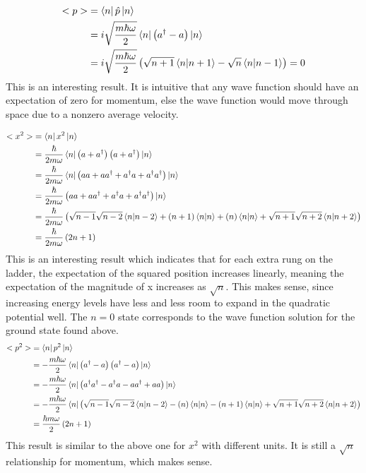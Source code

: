 \documentclass[10pt]{article} %
\begin{document}
\begin{align*}
  <p> &= \bra{n}\hat{p}\ket{n}\\
  &= i\sqrt{\frac{m\hbar\omega}{2}}\bra{n}\left(a^\dagger-a\right)\ket{n}\\
  &= i\sqrt{\frac{m\hbar\omega}{2}}
  \left(\sqrt{n+1}\bra{n}\ket{n+1} - \sqrt{n}\bra{n}\ket{n-1}\right) = 0\\
\end{align*}
This is an interesting result. It is intuitive that any wave function should have an expectation of
zero for momentum, else the wave function would move through space due to a nonzero average
velocity.

\begin{align*}
  <x^2> &= \bra{n}x^2\ket{n}\\
  &= \frac{\hbar}{2m\omega}\bra{n}\left(a + a^\dagger\right)\left(a + a^\dagger\right)\ket{n}\\
  &= \frac{\hbar}{2m\omega}\bra{n}
  \left(aa + aa^\dagger + a^\dagger a + a^\dagger a^\dagger\right)\ket{n}\\
  &= \frac{\hbar}{2m\omega}
  \left(aa + aa^\dagger + a^\dagger a + a^\dagger a^\dagger\right)\ket{n}\\
  &= \frac{\hbar}{2m\omega} \left(\sqrt{n-1}\sqrt{n-2}\bra{n}\ket{n-2} + (n+1)\bra{n}\ket{n} +
  (n)\bra{n}\ket{n} + \sqrt{n+1}\sqrt{n+2}\bra{n}\ket{n+2}\right)\\
  &= \frac{\hbar}{2m\omega} \left(2n+1\right)\\
\end{align*}
This is an interesting result which indicates that for each extra rung on the ladder, the
expectation of the squared position increases linearly, meaning the expectation of the magnitude
of x increases as $\sqrt{n}$. This makes sense, since increasing energy levels have less and less
room to expand in the quadratic potential well. The $n=0$ state corresponds to the wave function
solution for the ground state found above.\\

\begin{align*}
  <p^2> &= \bra{n}p^2\ket{n}\\
  &= -\frac{m\hbar\omega}{2}\bra{n}\left(a^\dagger-a\right)\left(a^\dagger-a\right)\ket{n}\\
  &= -\frac{m\hbar\omega}{2}\bra{n}
  \left(a^\dagger a^\dagger - a^\dagger a - aa^\dagger + aa\right)\ket{n}\\
  &= -\frac{m\hbar\omega}{2}\bra{n}\left(\sqrt{n-1}\sqrt{n-2}\bra{n}\ket{n-2}
  - (n)\bra{n}\ket{n} - (n+1)\bra{n}\ket{n} + \sqrt{n+1}\sqrt{n+2}\bra{n}\ket{n+2}\right)\\
  &= \frac{\hbar m\omega}{2}\left(2n + 1\right)
\end{align*}
This result is similar to the above one for $x^2$ with different units. It is still a $\sqrt{n}$
relationship for momentum, which makes sense.\\
\end{document}
